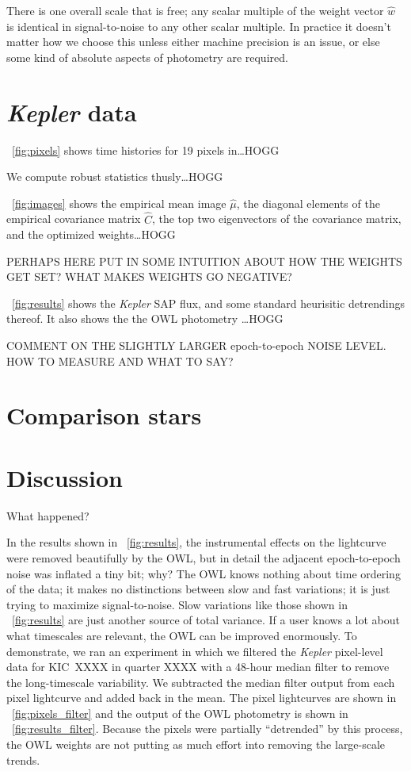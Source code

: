 \documentclass[12pt, letterpaper, preprint]{aastex}
\newcommand{\project}[1]{\textsl{#1}}
\begin{document}
There is one overall scale that is free;
  any scalar multiple of the weight vector $\hat{w}$ is identical in signal-to-noise
  to any other scalar multiple.
In practice it doesn't matter how we choose this unless either machine precision is an issue,
  or else some kind of absolute aspects of photometry are required.

\section{\project{Kepler} data}

\figurename~\ref{fig:pixels} shows time histories for 19 pixels in\ldots HOGG

We compute robust statistics thusly\ldots HOGG

\figurename~\ref{fig:images} shows the empirical mean image $\hat{\mu}$,
  the diagonal elements of the empirical covariance matrix $\hat{C}$,
  the top two eigenvectors of the covariance matrix,
  and the optimized weights\ldots HOGG

PERHAPS HERE PUT IN SOME INTUITION ABOUT HOW THE WEIGHTS GET SET?  WHAT MAKES WEIGHTS GO NEGATIVE?

\figurename~\ref{fig:results} shows the \project{Kepler} SAP flux,
  and some standard heurisitic detrendings thereof.
It also shows the the OWL photometry \ldots HOGG

COMMENT ON THE SLIGHTLY LARGER epoch-to-epoch NOISE LEVEL.  HOW TO MEASURE AND WHAT TO SAY?

\section{Comparison stars}

\section{Discussion}

What happened?

In the results shown in \figurename~\ref{fig:results},
  the instrumental effects on the lightcurve were removed beautifully by the OWL,
  but in detail
  the adjacent epoch-to-epoch noise was inflated a tiny bit;
  why?
The OWL knows nothing about time ordering of the data;
  it makes no distinctions between slow and fast variations;
  it is just trying to maximize signal-to-noise.
Slow variations like those shown in \figurename~\ref{fig:results}
  are just another source of total variance.
If a user knows a lot about what timescales are relevant,
  the OWL can be improved enormously.
To demonstrate, we ran an experiment in which we filtered the \project{Kepler} pixel-level data
  for KIC~XXXX in quarter XXXX
  with a 48-hour median filter to remove the long-timescale variability.
We subtracted the median filter output from each pixel lightcurve and added back in the mean.
The pixel lightcurves are shown in \figurename~\ref{fig:pixels_filter}
  and the output of the OWL photometry is shown in \figurename~\ref{fig:results_filter}.
Because the pixels were partially ``detrended'' by this process,
  the OWL weights are not putting as much effort into removing the large-scale trends.
\end{document}
